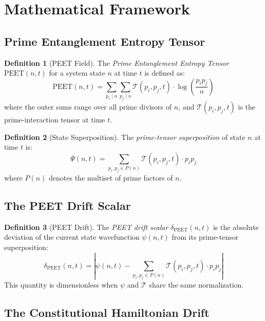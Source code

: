 \documentclass[11pt,letterpaper]{article}
\theoremstyle{definition}
\newtheorem{definition}{Definition}[section]
\theoremstyle{remark}
\newcommand{\peet}{\mathrm{PEET}}
\begin{document}
\section{Mathematical Framework}

\subsection{Prime Entanglement Entropy Tensor}

\begin{definition}[PEET Field]
The \emph{Prime Entanglement Entropy Tensor} \(\peet(n,t)\) for
a system state \(n\) at time \(t\) is defined as:
\[
  \peet(n,t) = \sum_{p_i \mid n} \sum_{p_j \mid n}
    \mathcal{T}(p_i, p_j, t) \cdot \log\!\left(\frac{p_i p_j}{n}\right)
\]
where the outer sums range over all prime divisors of \(n\),
and \(\mathcal{T}(p_i, p_j, t)\) is the prime-interaction tensor
at time \(t\).
\end{definition}

\begin{definition}[State Superposition]
The \emph{prime-tensor superposition} of state \(n\) at time \(t\) is:
\[
  \Psi(n,t) = \sum_{p_i, p_j \in P(n)} \mathcal{T}(p_i, p_j, t) \cdot p_i p_j
\]
where \(P(n)\) denotes the multiset of prime factors of \(n\).
\end{definition}

\subsection{The PEET Drift Scalar}

\begin{definition}[PEET Drift]
\label{def:peet-drift}
The \emph{PEET drift scalar} \(\delta_{\peet}(n,t)\) is the
absolute deviation of the current state wavefunction \(\psi(n,t)\)
from its prime-tensor superposition:
\begin{equation}
  \boxed{
    \delta_{\peet}(n,t) =
    \left| \psi(n,t) - \sum_{p_i, p_j \in P(n)}
    \mathcal{T}(p_i, p_j, t) \cdot p_i p_j \right|
  }
  \label{eq:peet-drift}
\end{equation}
This quantity is dimensionless when \(\psi\) and \(\mathcal{T}\)
share the same normalization.
\end{definition}

\subsection{The Constitutional Hamiltonian Drift}
\end{document}
